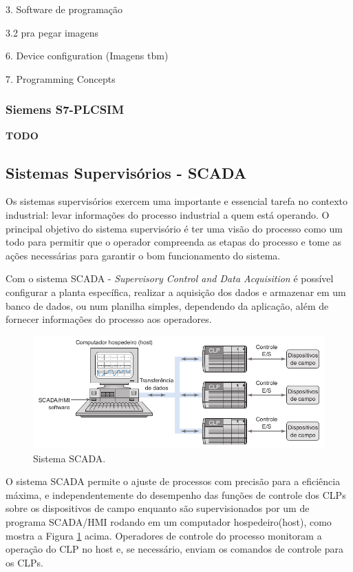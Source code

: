 \documentclass[a4paper, 12pt]{article}
\begin{document}
		3. Software de programação
		
		3.2 pra pegar imagens
		
		6. Device configuration (Imagens tbm)
		
		7. Programming Concepts
		
		\subsubsection{Siemens S7-PLCSIM}
		
			\textbf{TODO}
	
	\subsection{Sistemas Supervisórios - SCADA}
		
		Os sistemas supervisórios exercem uma importante e essencial tarefa no contexto
		industrial: levar informações do processo industrial a quem está operando.
		O principal objetivo do sistema supervisório é ter uma visão do processo como um
		todo para permitir que o operador compreenda as etapas do processo e tome as ações
		necessárias para garantir o bom funcionamento do sistema.
		
		Com o sistema SCADA - \textit{Supervisory Control and Data Acquisition} é possível
		configurar a planta específica, realizar a aquisição dos dados e armazenar em um
		banco de dados, ou num planilha simples, dependendo da aplicação, além de fornecer
		informações do processo aos operadores.
		
		\begin{figure}[H]
			\centering
			\includegraphics[scale=0.5]{figures/SCADA.png}
			\caption{Sistema SCADA.}
			\label{fig:scada}
		\end{figure}
		
		O sistema SCADA permite o ajuste de processos com precisão para a eficiência máxima, e
		independentemente do desempenho das funções de controle dos CLPs sobre os dispositivos
		de campo enquanto são supervisionados por um de programa SCADA/HMI rodando em um computador
		hospedeiro(host), como mostra a Figura \ref{fig:scada} acima. Operadores de controle do processo monitoram
		a operação do CLP no host e, se necessário, enviam os comandos de controle para os CLPs.
		
\end{document}
